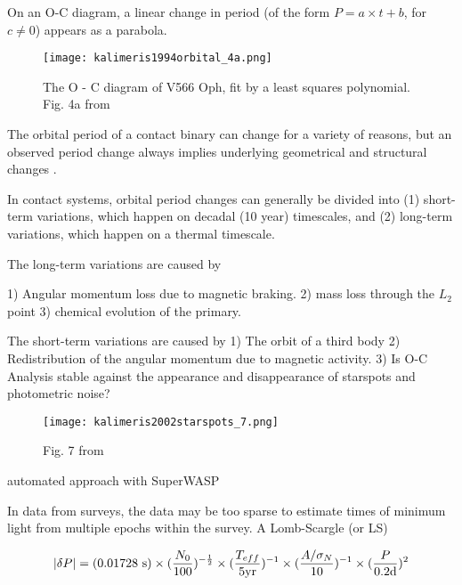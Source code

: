 \documentclass[12pt]{article} %
\numberwithin{equation}{section} %
\begin{document}
On an O-C diagram, a linear change in period (of the form $P = a \times t + b$, for $c \neq 0$) appears as a parabola.

\begin{figure}[H]
\centering
\texttt{[image: kalimeris1994orbital\_4a.png]}
\caption{ The O - C diagram of V566 Oph, fit by a least squares polynomial. Fig. 4a from \citet{kalimeris1994orbital}}
\label{fig: kalimeris1994orbital_4a}
\end{figure}

The orbital period of a contact binary can change for a variety of reasons, but an observed period change always implies underlying geometrical and structural changes \citep{kalimeris1994orbital}.

In contact systems, orbital period changes can generally be divided into (1) short-term variations, which happen on decadal (10 year) timescales, and (2) long-term variations, which happen on a thermal timescale.

The long-term variations are caused by

1) Angular momentum loss due to magnetic braking.
2) mass loss through the $L_{2}$ point 
3) chemical evolution of the primary.

The short-term variations are caused by
1) The orbit of a third body
2) Redistribution of the angular momentum due to magnetic activity.
3) 
Is O-C Analysis stable against the appearance and disappearance of starspots and photometric noise? \citep{kalimeris2002starspots}

\begin{figure}[H]
\centering
\texttt{[image: kalimeris2002starspots\_7.png]}
\caption{ Fig. 7 from \citet{kalimeris2002starspots}}
\label{fig: kalimeris2002starspots_7}
\end{figure}

automated approach with SuperWASP \citep{lohr2015orbital}

In data from surveys, the data may be too sparse to estimate times of minimum light from multiple epochs within the survey. A Lomb-Scargle (or LS) \citep{scargle1982studies}

\citep{horne1986prescription} 

\begin{equation} \label{eqn: horne_baliunas}
|\delta P| = (0.01728\text{ s}) \times (\frac{N_{0}}{100})^{-\frac{1}{2}} \times (\frac{T_{eff}}{5\text{yr}})^{-1} \\  \times (\frac{A/ \sigma_{N}}{10})^{-1} \times (\frac{P}{0.2\text{d}})^{2}
\end{equation}
\end{document}
